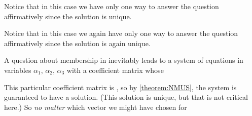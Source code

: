 \documentclass{ximera}
\begin{document}
\begin{example}
  \begin{question}
    \begin{multipleChoice}
    \end{multipleChoice}
    
    \begin{feedback}[correct]
      \begin{question}
        \begin{multipleChoice}
        \end{multipleChoice}

        \begin{feedback}[correct]
          Notice that in this case we have only one way to answer the
          question affirmatively since the solution is unique.
        \end{feedback}
      \end{question}
    \end{feedback}
  \end{question}

  \begin{question}
    \begin{multipleChoice}
    \end{multipleChoice}

    \begin{feedback}[correct]
      Notice that in this case we again have only one way to answer the
      question affirmatively since the solution is again unique.
    \end{feedback}
  \end{question}

  \begin{question}
    A question about membership in inevitably leads to a
    system of  equations in  variables
    $\alpha_1,\,\alpha_2,\,\alpha_3$ with a coefficient matrix whose

    This particular coefficient matrix is
    , so by
    \ref{theorem:NMUS}, the system is guaranteed to have a solution.
    (This solution is unique, but that is not critical here.)  So
    \textit{no matter} which vector we might have chosen for
  \end{question}
\end{example}
\end{document}
